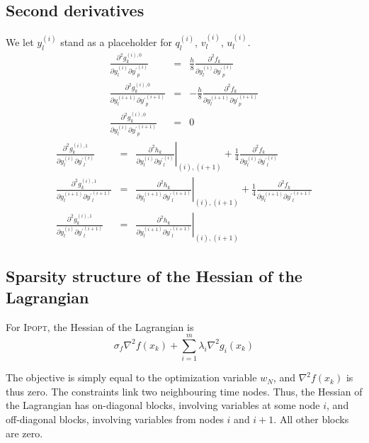 \documentclass[a4paper]{article}
\begin{document}
\subsection{Second derivatives}
We let $y_l^{(i)}$ stand as a placeholder for $q_l^{(i)}$, $v_l^{(i)}$, $u_l^{(i)}$.
\begin{eqnarray}
\frac{\partial^2 g_k^{(i),0}}{\partial y_l^{(i)} \partial {y^\prime}_p^{(i)}} &=&
\frac{h}{8} \frac{\partial^2 f_k}{\partial y_l^{(i)} \partial {y^\prime}_p^{(i)}}\\
\frac{\partial^2 g_k^{(i),0}}{\partial y_l^{(i+1)} \partial {y^\prime}_p^{(i+1)}} &=&
-\frac{h}{8} \frac{\partial^2 f_k}{\partial y_l^{(i+1)} \partial {y^\prime}_p^{(i+1)}}\\
\frac{\partial^2 g_k^{(i),0}}{\partial y_l^{(i)} \partial {y^\prime}_p^{(i+1)}} &=& 0
\end{eqnarray}
\begin{eqnarray}
\frac{\partial^2 g_k^{(i),1}}{\partial y_l^{(i)} \partial {y^\prime}_l^{(i)}} &=&
\left. \frac{\partial^2 h_k}{\partial y_l^{(i)} \partial {y^\prime}_l^{(i)}} \right|_{(i), (i+1)} +
\frac{1}{4} \frac{\partial^2 f_k}{\partial y_l^{(i)} \partial {y^\prime}_l^{(i)}}\\
\frac{\partial^2 g_k^{(i),1}}{\partial y_l^{(i+1)} \partial {y^\prime}_l^{(i+1)}} &=&
\left. \frac{\partial^2 h_k}{\partial y_l^{(i+1)} \partial {y^\prime}_l^{(i+1)}} \right|_{(i), (i+1)} +
\frac{1}{4} \frac{\partial^2 f_k}{\partial y_l^{(i+1)} \partial {y^\prime}_l^{(i+1)}}\\
\frac{\partial^2 g_k^{(i),1}}{\partial y_l^{(i)} \partial {y^\prime}_l^{(i+1)}} &=&
\left. \frac{\partial^2 h_k}{\partial y_l^{(i+1)} \partial {y^\prime}_l^{(i+1)}} \right|_{(i), (i+1)}
\end{eqnarray}

\subsection{Sparsity structure of the Hessian of the Lagrangian}
For \textsc{Ipopt}, the Hessian of the Lagrangian is
\begin{equation}
\sigma_f \nabla^2 f(x_k) + \sum_{i=1}^{m} \lambda_i \nabla^2 g_i(x_k)
\end{equation}

The objective is simply equal to the optimization variable $w_N$, and $\nabla^2 f(x_k)$ is thus zero. The constraints link two neighbouring time nodes. Thus, the Hessian of the Lagrangian has on-diagonal blocks, involving variables at some node $i$, and off-diagonal blocks, involving variables from nodes $i$ and $i+1$. All other blocks are zero.
\end{document}
